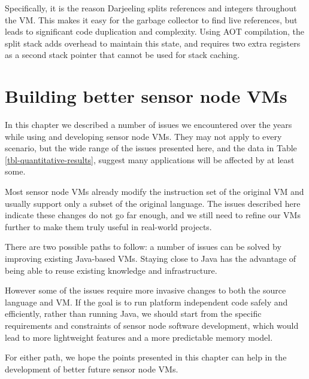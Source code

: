 Specifically, it is the reason Darjeeling splits references and integers throughout the VM. This makes it easy for the garbage collector to find live references, but leads to significant code duplication and complexity. Using AOT compilation, the split stack adds overhead to maintain this state, and requires two extra registers as a second stack pointer that cannot be used for stack caching.




\section{Building better sensor node VMs}
In this chapter we described a number of issues we encountered over the years while using and developing sensor node VMs. They may not apply to every scenario, but the wide range of the issues presented here, and the data in Table \ref{tbl-quantitative-results}, suggest many applications will be affected by at least some.

Most sensor node VMs already modify the instruction set of the original VM and usually support only a subset of the original language. The issues described here indicate these changes do not go far enough, and we still need to refine our VMs further to make them truly useful in real-world projects.

There are two possible paths to follow: a number of issues can be solved by improving existing Java-based VMs. Staying close to Java has the advantage of being able to reuse existing knowledge and infrastructure.

However some of the issues require more invasive changes to both the source language and VM. If the goal is to run platform independent code safely and efficiently, rather than running Java, we should start from the specific requirements and constraints of sensor node software development, which would lead to more lightweight features and a more predictable memory model.

For either path, we hope the points presented in this chapter can help in the development of better future sensor node VMs.
